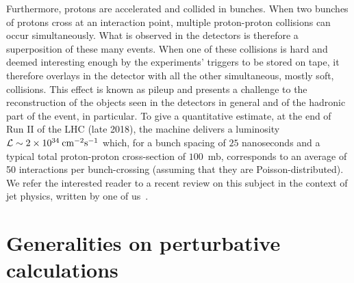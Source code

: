 Furthermore, protons are accelerated and collided in bunches.
%
When two bunches of protons cross at an interaction point, multiple
proton-proton collisions can occur simultaneously. What is observed in
the detectors is therefore a superposition of these many events.
%
When one of these collisions is hard and deemed interesting enough by
the experiments' triggers to be stored on tape, it therefore
overlays in the detector with all the other simultaneous, mostly
soft, collisions.
%
This effect is known as pileup and presents a challenge to the
reconstruction of the objects seen in the detectors in general and of
the hadronic part of the event, in particular.
%
To give a quantitative estimate, at the end of Run II of the LHC (late
2018), the machine delivers a luminosity
${\cal L}\sim 2\times 10^{34}\:\text{cm}^{-2}\text{s}^{-1}$ which, for a
bunch spacing of $25$ nanoseconds and a typical total proton-proton
cross-section of $100$~mb, corresponds to an average of 50 interactions
per bunch-crossing (assuming that they are Poisson-distributed).
%
We refer the interested reader to a recent review on this subject in
the context of jet physics, written by one of us~\cite{Soyez:2018opl}.

\section{Generalities on perturbative calculations}\label{sec:generalities}


